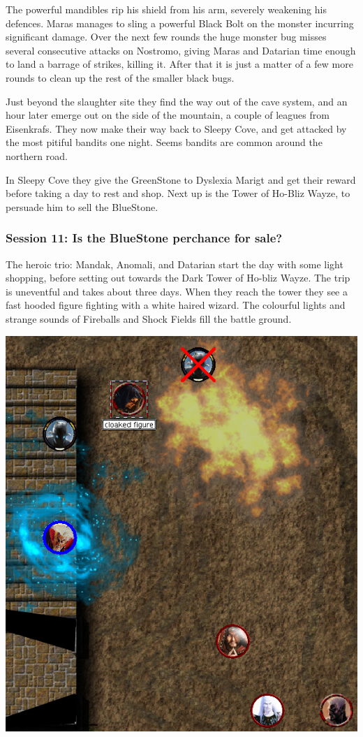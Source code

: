 The powerful mandibles rip his shield from his arm, severely weakening his defences. Maras manages to sling a powerful Black Bolt on the monster incurring significant damage. Over the next few rounds the huge monster bug misses several consecutive attacks on Nostromo, giving Maras and Datarian time enough to land a barrage of strikes, killing it. After that it is just a matter of a few more rounds to clean up the rest of the smaller black bugs.

Just beyond the slaughter site they find the way out of the cave system, and an hour later emerge out on the side of the mountain, a couple of leagues from Eisenkrafs. They now make their way back to Sleepy Cove, and get attacked by the most pitiful bandits one night. Seems bandits are common around the northern road.

In Sleepy Cove they give the GreenStone to Dyslexia Marigt and get their reward before taking a day to rest and shop. Next up is the Tower of Ho-Bliz Wayze, to persuade him to sell the BlueStone.


\subsubsection*{Session 11: Is the BlueStone perchance for sale?}
The heroic trio: Mandak, Anomali, and Datarian start the day with some light shopping, before setting out towards the Dark Tower of Ho-bliz Wayze. The trip is uneventful and takes about three days.
When they reach the tower they see a fast hooded figure fighting with a white haired wizard. The colourful lights and strange sounds of Fireballs and Shock Fields fill the battle ground.

\begin{center}
\vspace{0.5 cm}
\includegraphics[width=0.7\linewidth]{./figs/playthrough/tower-fight.png}
\vspace{0.5 cm}
\end{center}

